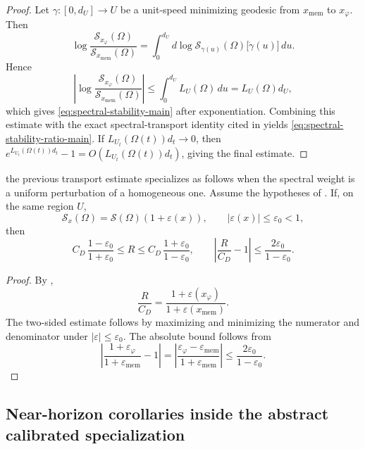 \begin{proof}
Let $\gamma:[0,d_U]\to U$ be a unit-speed minimizing geodesic from $x_{\mathrm{mem}}$ to $x_\varphi$. Then
\[
\log\frac{\mathcal S_{x_\varphi}(\Omega)}
         {\mathcal S_{x_{\mathrm{mem}}}(\Omega)}
=
\int_0^{d_U}
d\log\mathcal S_{\gamma(u)}(\Omega)\bigl[\dot\gamma(u)\bigr]\,du.
\]
Hence
\[
\left|
\log\frac{\mathcal S_{x_\varphi}(\Omega)}
         {\mathcal S_{x_{\mathrm{mem}}}(\Omega)}
\right|
\le
\int_0^{d_U}L_U(\Omega)\,du
=L_U(\Omega)d_U,
\]
which gives \eqref{eq:spectral-stability-main} after exponentiation. Combining
this estimate with the exact spectral-transport identity cited in
 yields
\eqref{eq:spectral-stability-ratio-main}. If $L_{U_t}(\Omega(t))d_t\to0$, then
$e^{L_{U_t}(\Omega(t))d_t}-1=O(L_{U_t}(\Omega(t))d_t)$, giving the final
estimate.
\end{proof}

\begin{corollary}\label{cor:spectral-stability-perturbative-main}
\ResponseStandingClause the previous transport estimate
specializes as follows when the spectral weight is a uniform perturbation of a
homogeneous one.
Assume the hypotheses
of . If, on the same region $U$,
\[
\mathcal S_x(\Omega)=\mathcal S(\Omega)(1+\varepsilon(x)),
\qquad
|\varepsilon(x)|\le\varepsilon_0<1,
\]
then
\[
C_D\,\frac{1-\varepsilon_0}{1+\varepsilon_0}
\le R\le
C_D\,\frac{1+\varepsilon_0}{1-\varepsilon_0},
\qquad
\left|\frac{R}{C_D}-1\right|
\le
\frac{2\varepsilon_0}{1-\varepsilon_0}.
\]
\end{corollary}

\begin{proof}
By ,
\[
\frac{R}{C_D}
=
\frac{1+\varepsilon(x_\varphi)}{1+\varepsilon(x_{\mathrm{mem}})}.
\]
The two-sided estimate follows by maximizing and minimizing the numerator and denominator under $|\varepsilon|\le\varepsilon_0$. The absolute bound follows from
\[
\left|
\frac{1+\varepsilon_\varphi}{1+\varepsilon_{\mathrm{mem}}}-1
\right|
=
\left|\frac{\varepsilon_\varphi-\varepsilon_{\mathrm{mem}}}{1+\varepsilon_{\mathrm{mem}}}\right|
\le
\frac{2\varepsilon_0}{1-\varepsilon_0}.
\]
\end{proof}

\subsection{Near-horizon corollaries inside the abstract calibrated specialization}

